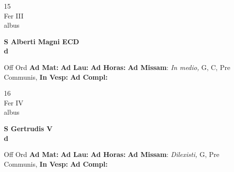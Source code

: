 \documentclass[10pt, openany]{book}
\begin{document}
        \begin{center}
            \begin{minipage}{3.5in}
                \vspace{2em}
                \begin{minipage}{0.5in}
                    {\Huge 15} \\
                    {\normalsize Fer III} \\
                    {\normalsize albus}
                \end{minipage}
                \begin{minipage}{3.0in}
                    \textbf{ \large S Alberti Magni ECD \\
                    \textnormal{\normalsize d}} \\ 
                \end{minipage}
                \begin{justify}Off Ord
                    \textbf{Ad Mat: }
                    \textbf{Ad Lau: }
                    \textbf{Ad Horas: }\textbf{Ad Missam}: \textit{In medio,} G, C, Pre Communis,  
                    \textbf{In Vesp: }
                    \textbf{Ad Compl: }
                \end{justify}
            \end{minipage}
        \end{center}
    
        \begin{center}
            \begin{minipage}{3.5in}
                \vspace{2em}
                \begin{minipage}{0.5in}
                    {\Huge 16} \\
                    {\normalsize Fer IV} \\
                    {\normalsize albus}
                \end{minipage}
                \begin{minipage}{3.0in}
                    \textbf{ \large S Gertrudis V \\
                    \textnormal{\normalsize d}} \\ 
                \end{minipage}
                \begin{justify}Off Ord
                    \textbf{Ad Mat: }
                    \textbf{Ad Lau: }
                    \textbf{Ad Horas: }\textbf{Ad Missam}: \textit{Dilexisti,} G, Pre Communis,  
                    \textbf{In Vesp: }
                    \textbf{Ad Compl: }
                \end{justify}
            \end{minipage}
        \end{center}
    
\end{document}
